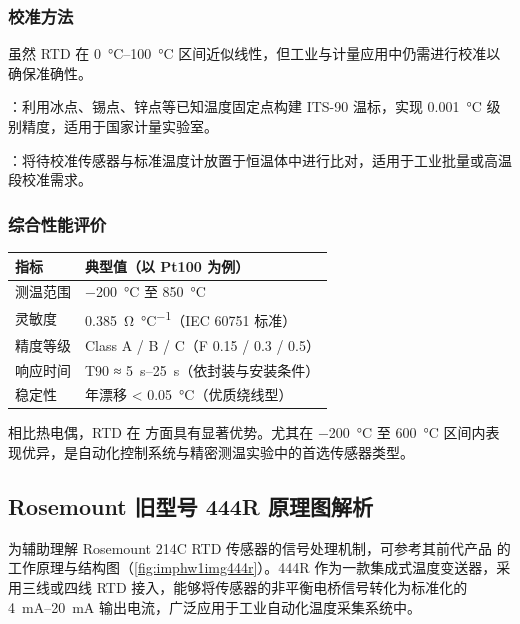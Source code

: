 \subsubsection{校准方法}

虽然 RTD 在 \SIrange{0}{100}{\degreeCelsius} 区间近似线性，但工业与计量应用中仍需进行校准以确保准确性。

：利用冰点、锡点、锌点等已知温度固定点构建 ITS-90 温标，实现 \SI{0.001}{\degreeCelsius} 级别精度，适用于国家计量实验室。

：将待校准传感器与标准温度计放置于恒温体中进行比对，适用于工业批量或高温段校准需求。

\subsubsection{综合性能评价}

\begin{table}[htbp]
	\centering
	\begin{tabular}{|l|p{9.5cm}|}
		\hline
		\textbf{指标} & \textbf{典型值（以 Pt100 为例）} \\
		\hline
		测温范围 & \SI{-200}{\degreeCelsius} 至 \SI{+850}{\degreeCelsius} \\
		灵敏度 & \SI{0.385}{\ohm\per\celsius}（IEC 60751 标准） \\
		精度等级 & Class A / B / C（F 0.15 / 0.3 / 0.5） \\
		响应时间 & T90 ≈ \SIrange{5}{25}{\second}（依封装与安装条件） \\
		稳定性 & 年漂移 < \SI{0.05}{\degreeCelsius}（优质绕线型） \\
		\hline
	\end{tabular}
\end{table}

\vspace{0.5em}

\noindent 相比热电偶，RTD 在  方面具有显著优势。尤其在 \SI{-200}{\degreeCelsius} 至 \SI{+600}{\degreeCelsius} 区间内表现优异，是自动化控制系统与精密测温实验中的首选传感器类型。

\subsection{Rosemount 旧型号 444R 原理图解析}

为辅助理解 Rosemount 214C RTD 传感器的信号处理机制，可参考其前代产品  的工作原理与结构图（\cref{fig:imphw1img444r}）。444R 作为一款集成式温度变送器，采用三线或四线 RTD 接入，能够将传感器的非平衡电桥信号转化为标准化的 \SIrange{4}{20}{\milli\ampere} 输出电流，广泛应用于工业自动化温度采集系统中。

